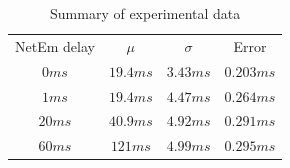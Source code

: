\documentclass[conference]{IEEEtran}
\begin{document}
\begin{table}
    \centering
    \begin{tabular}{c c c c}
        \toprule
        NetEm delay & $\mu$ & $\sigma$ & Error \\
        $0ms$   &    $19.4ms$   &   $3.43ms$    &   $0.203ms$ \\
        $1ms$   &    $19.4ms$   &   $4.47ms$    &   $0.264ms$ \\
        $20ms$   &    $40.9ms$   &   $4.92ms$    &   $0.291ms$ \\
        $60ms$   &    $121ms$   &   $4.99ms$    &   $0.295ms$ \\
        \bottomrule
    \end{tabular}\label{table:data} \\
    \caption{Summary of experimental data}\label{table:data}
\end{table}
\end{document}
